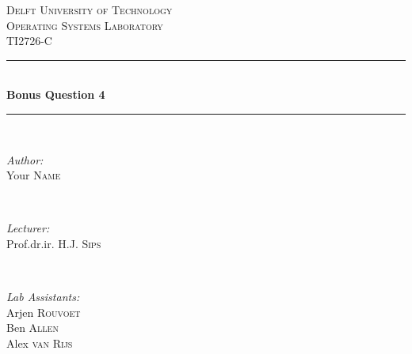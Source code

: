 \documentclass[12pt]{article}
\begin{document}
\begin{titlepage}

\newcommand{\HRule}{\rule{\linewidth}{0.5mm}} %

\center %
 

\textsc{\LARGE Delft University of Technology}\\[1.5cm] %
\textsc{\Large Operating Systems Laboratory}\\[0.5cm] %
\textsc{\large TI2726-C}\\[0.5cm] %


\HRule \\[0.4cm]
{ \huge \bfseries Bonus Question 4}\\[0.4cm] %
\HRule \\[1.5cm]
 

\begin{minipage}{0.4\textwidth}
\begin{flushleft} \large
\emph{Author:}\\
Your \textsc{Name} %
\end{flushleft}
\end{minipage}
~
\begin{minipage}{0.4\textwidth}
\begin{flushright} \large
\emph{Lecturer:} \\
Prof.dr.ir. H.J. \textsc{Sips} %
\end{flushright}
\end{minipage}\\[1cm]

\begin{minipage}{0.4\textwidth}
\begin{flushleft} \large
\emph{Lab Assistants:}\\
Arjen \textsc{Rouvoet}\\
Ben \textsc{Allen}\\
Alex \textsc{van Rijs} %
\end{flushleft}
\end{minipage}
~
\begin{minipage}{0.4\textwidth}
\begin{flushright} \large


\end{flushright}
\end{minipage}
\end{titlepage}
\end{document}
